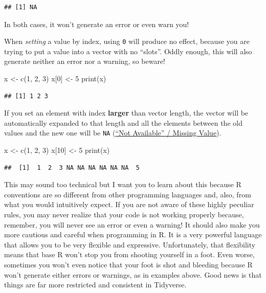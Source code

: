 \documentclass[
]{book}
\newenvironment{Shaded}{\begin{snugshade}}{\end{snugshade}}
\newcommand{\DecValTok}[1]{\textcolor[rgb]{0.00,0.00,0.81}{#1}}
\newcommand{\FunctionTok}[1]{\textcolor[rgb]{0.00,0.00,0.00}{#1}}
\newcommand{\NormalTok}[1]{#1}
\newcommand{\OtherTok}[1]{\textcolor[rgb]{0.56,0.35,0.01}{#1}}
\begin{document}
\begin{verbatim}
## [1] NA
\end{verbatim}

In both cases, it won't generate an error or even warn you!

When \emph{setting} a value by index, using \texttt{0} will produce no effect, because you are trying to put a value into a vector with no ``slots''. Oddly enough, this will also generate neither an error nor a warning, so beware!

\begin{Shaded}
\begin{Highlighting}[]
\NormalTok{x }\OtherTok{\textless{}{-}} \FunctionTok{c}\NormalTok{(}\DecValTok{1}\NormalTok{, }\DecValTok{2}\NormalTok{, }\DecValTok{3}\NormalTok{)}
\NormalTok{x[}\DecValTok{0}\NormalTok{] }\OtherTok{\textless{}{-}} \DecValTok{5}
\FunctionTok{print}\NormalTok{(x)}
\end{Highlighting}
\end{Shaded}

\begin{verbatim}
## [1] 1 2 3
\end{verbatim}

If you set an element with index \textbf{larger} than vector length, the vector will be automatically expanded to that length and all the elements between the old values and the new one will be \texttt{NA} (\href{https://stat.ethz.ch/R-manual/R-devel/library/base/html/NA.html}{``Not Available'' / Missing Value}).

\begin{Shaded}
\begin{Highlighting}[]
\NormalTok{x }\OtherTok{\textless{}{-}} \FunctionTok{c}\NormalTok{(}\DecValTok{1}\NormalTok{, }\DecValTok{2}\NormalTok{, }\DecValTok{3}\NormalTok{)}
\NormalTok{x[}\DecValTok{10}\NormalTok{] }\OtherTok{\textless{}{-}} \DecValTok{5}
\FunctionTok{print}\NormalTok{(x)}
\end{Highlighting}
\end{Shaded}

\begin{verbatim}
##  [1]  1  2  3 NA NA NA NA NA NA  5
\end{verbatim}

This may sound too technical but I want you to learn about this because R conventions are so different from other programming languages and, also, from what you would intuitively expect. If you are not aware of these highly peculiar rules, you may never realize that your code is not working properly because, remember, you will never see an error or even a warning! It should also make you more cautious and careful when programming in R. It is a very powerful language that allows you to be very flexible and expressive. Unfortunately, that flexibility means that base R won't stop you from shooting yourself in a foot. Even worse, sometimes you won't even notice that your foot is shot and bleeding because R won't generate either errors or warnings, as in examples above. Good news is that things are far more restricted and consistent in Tidyverse.
\end{document}
